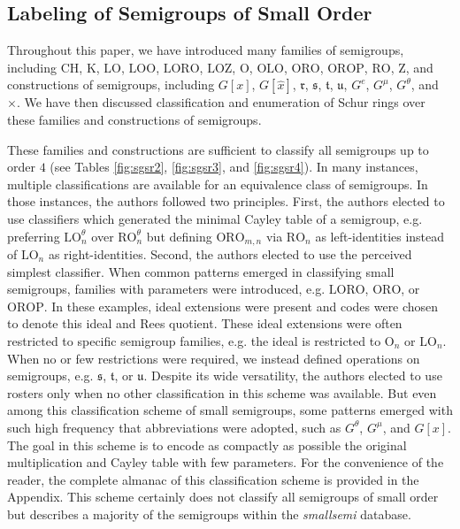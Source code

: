 \documentclass{article}
\theoremstyle{plain}
\theoremstyle{definition}
\renewcommand{\O}{\mathrm{O}}
\newcommand{\K}{\mathrm{K}}
\newcommand{\LO}{\mathrm{LO}}
\newcommand{\RO}{\mathrm{RO}}
\newcommand{\ORO}{\mathrm{ORO}}
\newcommand{\OLO}{\mathrm{OLO}}
\newcommand{\OROP}{\mathrm{OROP}}
\newcommand{\LOZ}{\mathrm{LOZ}}
\newcommand{\LOO}{\mathrm{LOO}}
\newcommand{\LORO}{\mathrm{LORO}}
\newcommand{\CH}{\mathrm{CH}}
\newcommand{\z}{\mathrm{Z}}
\begin{document}
\subsection{Labeling of Semigroups of Small Order}
Throughout this paper, we have introduced many families of semigroups, including $\CH$, $\K$, $\LO$, $\LOO$, $\LORO$, $\LOZ$, $\O$, $\OLO$, $\ORO$, $\OROP$, $\RO$, $\z$, and constructions of semigroups, including $G[x]$, $G[\hat{x}]$, $\mathfrak{r}$, $\mathfrak{s}$, $\mathfrak{t}$, $\mathfrak{u}$, $G^e$, $G^\mu$, $G^\theta$, and $\times.$ We have then discussed classification and enumeration of Schur rings over these families and constructions of semigroups. 

These families and constructions are sufficient to classify all semigroups up to order $4$ (see Tables \ref{fig:sgsr2}, \ref{fig:sgsr3}, and \ref{fig:sgsr4}). In many instances, multiple classifications are available for an equivalence class of semigroups. In those instances, the authors followed two principles. First, the authors elected to use classifiers which generated the minimal Cayley table of a semigroup, e.g. preferring $\LO_n^\theta$ over $\RO_n^\theta$ but defining $\ORO_{m,n}$ via $\RO_n$ as left-identities instead of $\LO_n$ as right-identities. Second, the authors elected to use the perceived simplest classifier. When common patterns emerged in classifying small semigroups, families with parameters were introduced, e.g. $\LORO$, $\ORO$, or $\OROP$. In these examples, ideal extensions were present and codes were chosen to denote this ideal and Rees quotient. These ideal extensions were often restricted to specific semigroup families, e.g. the ideal is restricted to $\O_n$ or $\LO_n$. When no or few restrictions were required, we instead defined operations on semigroups, e.g. $\mathfrak{s}$, $\mathfrak{t}$, or $\mathfrak{u}$. Despite its wide versatility, the authors elected to use rosters only when no other classification in this scheme was available. But even among this classification scheme of small semigroups, some patterns emerged with such high frequency that abbreviations were adopted, such as $G^\theta$, $G^\mu$, and $G[x]$. The goal in this scheme is to encode as compactly as possible the original multiplication and Cayley table with few parameters. For the convenience of the reader, the complete almanac of this classification scheme is provided in the Appendix. %
This scheme certainly does not classify all semigroups of small order but describes a majority of the semigroups within the \emph{smallsemi} database.
\end{document}

